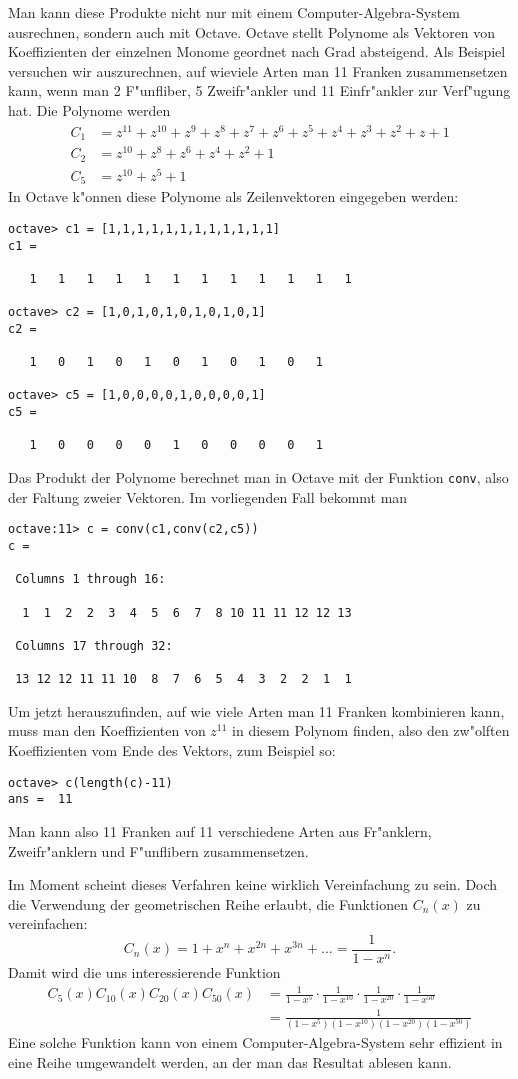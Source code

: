 Man kann diese Produkte nicht nur mit einem Computer-Algebra-System
ausrechnen, sondern auch mit Octave.
Octave stellt Polynome als
Vektoren von Koeffizienten der einzelnen Monome geordnet nach Grad
absteigend.
Als Beispiel versuchen wir auszurechnen, auf wieviele
Arten man 11 Franken zusammensetzen kann, wenn man 2 F"unfliber,
5 Zweifr"ankler und 11 Einfr"ankler zur Verf"ugung hat.
Die Polynome werden
\begin{align*}
C_1&=z^{11}+z^{10}+z^9+z^8+z^7+z^6+z^5+z^4+z^3+z^2+z+1\\
C_2&=z^{10}+z^8+z^6+z^4+z^2+1\\
C_5&=z^{10}+z^5+1
\end{align*}
In Octave k"onnen diese Polynome als Zeilenvektoren eingegeben werden:
\begin{verbatim}
octave> c1 = [1,1,1,1,1,1,1,1,1,1,1,1]
c1 =

   1   1   1   1   1   1   1   1   1   1   1   1

octave> c2 = [1,0,1,0,1,0,1,0,1,0,1]
c2 =

   1   0   1   0   1   0   1   0   1   0   1

octave> c5 = [1,0,0,0,0,1,0,0,0,0,1]
c5 =

   1   0   0   0   0   1   0   0   0   0   1
\end{verbatim}
Das Produkt der Polynome berechnet man in Octave mit der Funktion
{\tt conv}, also der Faltung zweier Vektoren.
Im vorliegenden Fall bekommt man
\begin{verbatim}
octave:11> c = conv(c1,conv(c2,c5))
c =

 Columns 1 through 16:

  1  1  2  2  3  4  5  6  7  8 10 11 11 12 12 13

 Columns 17 through 32:

 13 12 12 11 11 10  8  7  6  5  4  3  2  2  1  1
\end{verbatim}
Um jetzt herauszufinden, auf wie viele Arten man 11 Franken
kombinieren kann, muss man den Koeffizienten von $z^{11}$ in diesem
Polynom finden, also den zw"olften Koeffizienten vom Ende des
Vektors, zum Beispiel so:
\begin{verbatim}
octave> c(length(c)-11)
ans =  11
\end{verbatim}
Man kann also 11 Franken auf 11 verschiedene Arten aus Fr"anklern,
Zweifr"anklern und F"unflibern zusammensetzen.

Im Moment scheint dieses Verfahren keine wirklich Vereinfachung
zu sein.
Doch die Verwendung der geometrischen Reihe erlaubt, die
Funktionen $C_n(x)$ zu vereinfachen:
\[
C_n(x)=1+x^n+x^{2n}+x^{3n}+\dots = \frac1{1-x^n}.
\]
Damit wird die uns interessierende Funktion
\begin{align*}
C_5(x) C_{10}(x) C_{20}(x) C_{50}(x)
&=
\frac1{1-x^5}\cdot
\frac1{1-x^{10}}\cdot
\frac1{1-x^{20}}\cdot
\frac1{1-x^{50}}
\\
&=
\frac1{
(1-x^5)
(1-x^{10})
(1-x^{20})
(1-x^{50})
}
\end{align*}
Eine solche Funktion kann von einem Computer-Algebra-System sehr effizient
in eine Reihe umgewandelt werden, an der man das Resultat ablesen kann.

